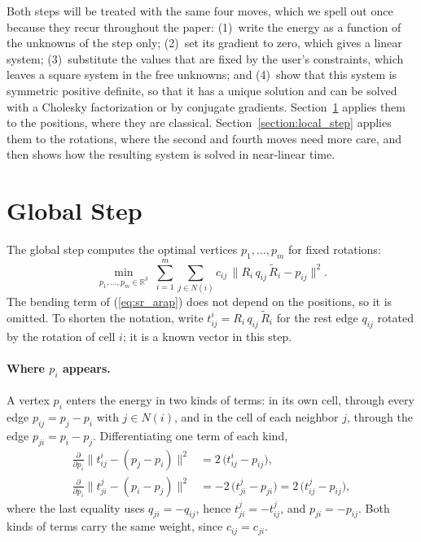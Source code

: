 \documentclass{birkjour}
\theoremstyle{remark}
\numberwithin{equation}{section}
\begin{document}
Both steps will be treated with the same four moves, which we spell out once because they recur throughout the paper: (1)~write the energy as a function of the unknowns of the step only; (2)~set its gradient to zero, which gives a linear system; (3)~substitute the values that are fixed by the user's constraints, which leaves a square system in the free unknowns; and (4)~show that this system is symmetric positive definite, so that it has a unique solution and can be solved with a Cholesky factorization or by conjugate gradients. Section~\ref{section:global_step} applies them to the positions, where they are classical. Section~\ref{section:local_step} applies them to the rotations, where the second and fourth moves need more care, and then shows how the resulting system is solved in near-linear time.

\section{Global Step}
\label{section:global_step}

The global step computes the optimal vertices $p_1, \dots, p_m$ for fixed rotations:
\begin{equation*}
\min_{p_1, \dots, p_m \in \mathbb R^3} \; \sum_{i=1}^m \sum_{j \in N(i)} c_{ij} \, \| R_i \, q_{ij} \, \tilde R_i - p_{ij} \|^2 .
\end{equation*}
The bending term of (\ref{eq:sr_arap}) does not depend on the positions, so it is omitted. To shorten the notation, write $t^i_{ij} = R_i \, q_{ij} \, \tilde R_i$ for the rest edge $q_{ij}$ rotated by the rotation of cell $i$; it is a known vector in this step.

\paragraph{Where $p_i$ appears.} A vertex $p_i$ enters the energy in two kinds of terms: in its own cell, through every edge $p_{ij} = p_j - p_i$ with $j \in N(i)$, and in the cell of each neighbor $j$, through the edge $p_{ji} = p_i - p_j$. Differentiating one term of each kind,
\begin{align*}
\frac{\partial}{\partial p_i} \| t^i_{ij} - (p_j - p_i) \|^2 &= 2 \, \big( t^i_{ij} - p_{ij} \big),
\\
\frac{\partial}{\partial p_i} \| t^j_{ji} - (p_i - p_j) \|^2 &= -2 \, \big( t^j_{ji} - p_{ji} \big) = 2 \, \big( t^j_{ij} - p_{ij} \big),
\end{align*}
where the last equality uses $q_{ji} = -q_{ij}$, hence $t^j_{ji} = -t^j_{ij}$, and $p_{ji} = -p_{ij}$. Both kinds of terms carry the same weight, since $c_{ij} = c_{ji}$.
\end{document}
